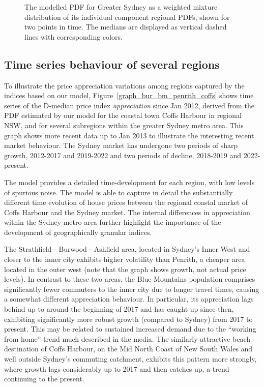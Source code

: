 \begin{figure}[H]
\begin{center}
\end{center}
\caption{  The modelled PDF for Greater Sydney as a weighted mixture distribution of its individual component regional PDFs, shown for two points in time.  The medians are displayed as vertical dashed lines with corresponding colors.}
\label{pdf_sydney_composite}
\end{figure}

\subsection{Time series behaviour of several regions}
\label{sec:result_series}


To illustrate the price appreciation variations among regions captured by the indices based on our model, Figure~\ref{graph_bur_bm_penrith_coffs} shows time series of the D-median price index \emph{appreciation} since Jan 2012, derived from the PDF estimated by our model for the coastal town Coffs Harbour in regional NSW, and for several subregions within the greater Sydney metro area. This graph shows more recent data up to Jan 2013 to illustrate the interesting recent market behaviour. The Sydney market has undergone two periods of sharp growth, 2012-2017 and 2019-2022 and two periods of decline, 2018-2019 and 2022-present.

The model provides a detailed time-development for each region, with low levels of spurious noise. The model is able to capture in detail the substantially different time evolution of house prices between the regional coastal market of Coffs Harbour and the Sydney market. The internal differences in appreciation within the Sydney metro area further highlight the importance of the development of geographically granular indices. 

The Strathfield - Burwood - Ashfield area, located in Sydney's Inner West and closer to the inner city exhibits higher volatility than Penrith, a cheaper area located in the outer west (note that the graph shows growth, not actual price levels). In contrast to these two areas, the Blue Mountains population comprises significantly fewer commuters to the inner city due to longer travel times, causing a somewhat different appreciation behaviour. In particular, its appreciation lags behind up to around the beginning of 2017 and has caught up since then, exhibiting significantly more robust growth (compared to Sydney) from 2017 to present. This may be related to sustained increased demand due to the ``working from home'' trend much described in the media. The similarly attractive beach destination of Coffs Harbour, on the Mid North Coast of New South Wales and well outside Sydney's commuting catchment, exhibits this pattern more strongly, where growth lags considerably up to 2017 and then catches up, a trend continuing to the present.

